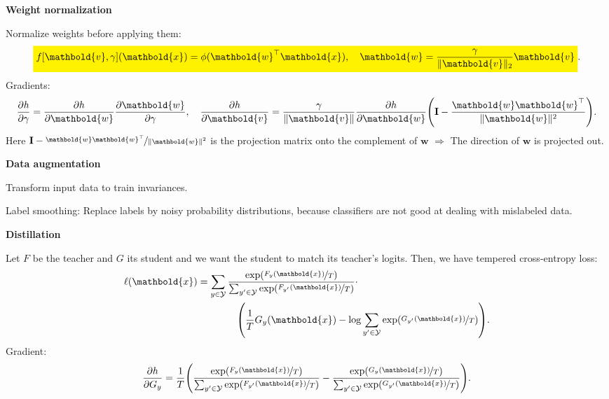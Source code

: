 \documentclass[10pt]{article}
\newenvironment{topic}[1]
{\textbf{\sffamily \footnotesize \colorbox{black}{\rlap{\textbf{\textcolor{white}{#1}}}\hspace{\linewidth}\hspace{-2\fboxsep}}}}
{}
\newenvironment{subtopic}[1]
{\begin{center}\textbf{\footnotesize \sffamily #1}\end{center}}
{}
\renewcommand{\mat}[1]{\ensuremath{\mathbf{#1}}}
\renewcommand{\vec}[1]{\ensuremath{\mathbold{#1}}}
\begin{document}
\begin{multicols*}{3}
\begin{topic}{Tricks of the trade}
        \begin{subtopic}{Weight normalization}
            Normalize weights before applying them: \[
                \colorbox{yellow}{$\displaystyle f[\vec{v},\gamma](\vec{x}) = \phi(\transpose{\vec{w}}\vec{x}), \quad \vec{w} = \frac{\gamma}{\| \vec{v} \|_2} \vec{v}$}.
            \]
            Gradients: \[
                \pdv{h}{\gamma} = \pdv{h}{\vec{w}} \pdv{\vec{w}}{\gamma}, \quad \pdv{h}{\vec{v}} = \frac{\gamma}{\| \vec{v} \|} \pdv{h}{\vec{w}} \lft( \mat{I} - \frac{\vec{w}\transpose{\vec{w}}}{\| \vec{w} \|^2} \rgt).
            \]
            Here $\mat{I} - \nicefrac{\vec{w}\transpose{\vec{w}}}{\| \vec{w} \|^2}$ is the projection matrix
            onto the complement of $\vec{w}$ $\Rightarrow$ The direction of $\vec{w}$ is projected out.
        \end{subtopic}

        \begin{subtopic}{Data augmentation}
            Transform input data to train invariances.

            Label smoothing: Replace labels by noisy probability distributions, because classifiers are not
            good at dealing with mislabeled data.
        \end{subtopic}

        \begin{subtopic}{Distillation}
            Let $F$ be the teacher and $G$ its student and we want the student to match its teacher's
            logits. Then, we have tempered cross-entropy loss:
            \begin{align*}
                \ell(\vec{x}) & = \sum_{y \in \mathcal{Y}} \frac{\exp(\nicefrac{F_y(\vec{x})}{T})}{\sum_{y' \in \mathcal{Y}} \exp(\nicefrac{F_{y'}(\vec{x})}{T})} \cdot \\
                              & \quad \quad \quad \quad \lft( \frac{1}{T} G_y(\vec{x}) - \log \sum_{y' \in \mathcal{Y}} \exp(\nicefrac{G_{y'}(\vec{x})}{T}) \rgt).
            \end{align*}
            Gradient: \[
                \pdv{h}{G_y} = \frac{1}{T} \lft( \frac{\exp(\nicefrac{F_y(\vec{x})}{T})}{\sum_{y' \in \mathcal{Y}} \exp(\nicefrac{F_{y'}(\vec{x})}{T})} - \frac{\exp(\nicefrac{G_y(\vec{x})}{T})}{\sum_{y' \in \mathcal{Y}} \exp(\nicefrac{G_{y'}(\vec{x})}{T})} \rgt).
            \]
        \end{subtopic}

    \end{topic}


\end{multicols*}
\end{document}

